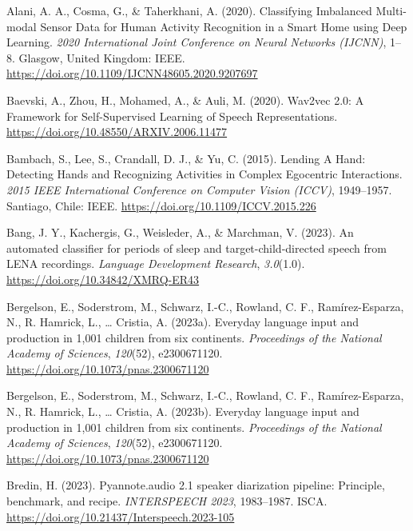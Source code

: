 \documentclass[
  man,floatsintext]{apa6}
\newlength{\cslhangindent}
\newenvironment{CSLReferences}[2] %
 {\begin{list}{}{%
  \setlength{\itemindent}{0pt}
  \setlength{\leftmargin}{0pt}
  \setlength{\parsep}{0pt}
  \ifodd #1
   \setlength{\leftmargin}{\cslhangindent}
   \setlength{\itemindent}{-1\cslhangindent}
  \fi
  \setlength{\itemsep}{#2\baselineskip}}}
 {\end{list}}
\begin{document}
\label{refs}
\begin{CSLReferences}{1}{0}
Alani, A. A., Cosma, G., \& Taherkhani, A. (2020). Classifying {Imbalanced Multi-modal Sensor Data} for {Human Activity Recognition} in a {Smart Home} using {Deep Learning}. \emph{2020 {International Joint Conference} on {Neural Networks} ({IJCNN})}, 1--8. Glasgow, United Kingdom: IEEE. \url{https://doi.org/10.1109/IJCNN48605.2020.9207697}

Baevski, A., Zhou, H., Mohamed, A., \& Auli, M. (2020). Wav2vec 2.0: {A Framework} for {Self-Supervised Learning} of {Speech Representations}. \url{https://doi.org/10.48550/ARXIV.2006.11477}

Bambach, S., Lee, S., Crandall, D. J., \& Yu, C. (2015). Lending {A Hand}: {Detecting Hands} and {Recognizing Activities} in {Complex Egocentric Interactions}. \emph{2015 {IEEE International Conference} on {Computer Vision} ({ICCV})}, 1949--1957. Santiago, Chile: IEEE. \url{https://doi.org/10.1109/ICCV.2015.226}

Bang, J. Y., Kachergis, G., Weisleder, A., \& Marchman, V. (2023). An automated classifier for periods of sleep and target-child-directed speech from {LENA} recordings. \emph{Language Development Research}, \emph{3.0}(1.0). \url{https://doi.org/10.34842/XMRQ-ER43}

Bergelson, E., Soderstrom, M., Schwarz, I.-C., Rowland, C. F., Ramírez-Esparza, N., R. Hamrick, L., \ldots{} Cristia, A. (2023a). Everyday language input and production in 1,001 children from six continents. \emph{Proceedings of the National Academy of Sciences}, \emph{120}(52), e2300671120. \url{https://doi.org/10.1073/pnas.2300671120}

Bergelson, E., Soderstrom, M., Schwarz, I.-C., Rowland, C. F., Ramírez-Esparza, N., R. Hamrick, L., \ldots{} Cristia, A. (2023b). Everyday language input and production in 1,001 children from six continents. \emph{Proceedings of the National Academy of Sciences}, \emph{120}(52), e2300671120. \url{https://doi.org/10.1073/pnas.2300671120}

Bredin, H. (2023). Pyannote.audio 2.1 speaker diarization pipeline: Principle, benchmark, and recipe. \emph{{INTERSPEECH} 2023}, 1983--1987. ISCA. \url{https://doi.org/10.21437/Interspeech.2023-105}


\end{CSLReferences}
\end{document}
